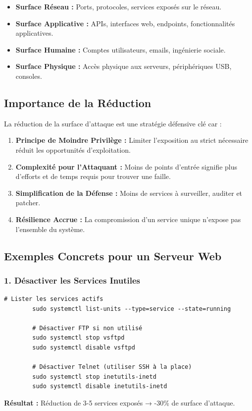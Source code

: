 \documentclass[12pt,a4paper,openany]{report}
\begin{document}
	\begin{itemize}
		\item \textbf{Surface Réseau :} Ports, protocoles, services exposés sur le réseau.
		\item \textbf{Surface Applicative :} APIs, interfaces web, endpoints, fonctionnalités applicatives.
		\item \textbf{Surface Humaine :} Comptes utilisateurs, emails, ingénierie sociale.
		\item \textbf{Surface Physique :} Accès physique aux serveurs, périphériques USB, consoles.
	\end{itemize}
	
	\subsection{Importance de la Réduction}
	La réduction de la surface d'attaque est une stratégie défensive clé car :
	
	\begin{enumerate}
		\item \textbf{Principe de Moindre Privilège :} Limiter l'exposition au strict nécessaire réduit les opportunités d'exploitation.
		
		\item \textbf{Complexité pour l'Attaquant :} Moins de points d'entrée signifie plus d'efforts et de temps requis pour trouver une faille.
		
		\item \textbf{Simplification de la Défense :} Moins de services à surveiller, auditer et patcher.
		
		\item \textbf{Résilience Accrue :} La compromission d'un service unique n'expose pas l'ensemble du système.
	\end{enumerate}
	
	\subsection{Exemples Concrets pour un Serveur Web}
	
	\subsubsection{1. Désactiver les Services Inutiles}
	\begin{lstlisting}[caption=Identification et arrêt des services non nécessaires]
		# Lister les services actifs
		sudo systemctl list-units --type=service --state=running
		
		# Désactiver FTP si non utilisé
		sudo systemctl stop vsftpd
		sudo systemctl disable vsftpd
		
		# Désactiver Telnet (utiliser SSH à la place)
		sudo systemctl stop inetutils-inetd
		sudo systemctl disable inetutils-inetd
	\end{lstlisting}
	\textbf{Résultat :} Réduction de 3-5 services exposés → -30\% de surface d'attaque.
	
\end{document}
